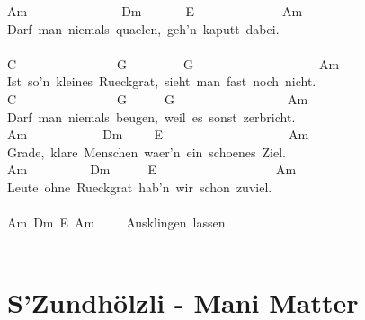 \documentclass[]{book}
\let\stdsection\section
\renewcommand\section{\clearpage\stdsection}
\begin{document}
Am~~~~~~~~~~~~~~~Dm~~~~~~~E~~~~~~~~~~~~~~Am\\
Darf~man~niemals~quaelen,~geh'n~kaputt~dabei.\\
~\\
C~~~~~~~~~~~~~~~~G~~~~~~~~~G~~~~~~~~~~~~~~~~~~~~Am~\\
Ist~so'n~kleines~Rueckgrat,~sieht~man~fast~noch~nicht.\\
C~~~~~~~~~~~~~~~~G~~~~~~G~~~~~~~~~~~~~~~~~~Am~\\
Darf~man~niemals~beugen,~weil~es~sonst~zerbricht.\\
Am~~~~~~~~~~~~Dm~~~~~E~~~~~~~~~~~~~~~~~~~~Am\\
Grade,~klare~Menschen~waer'n~ein~schoenes~Ziel.\\
Am~~~~~~~~~~Dm~~~~~~E~~~~~~~~~~~~~~~~~~~Am\\
Leute~ohne~Rueckgrat~hab'n~wir~schon~zuviel.\\
~\\
Am~Dm~E~Am~~~~~Ausklingen~lassen~~\\
~\\

\hypertarget{szundholzli---mani-matter}{%
\section{S'Zundhölzli - Mani Matter}\label{szundholzli---mani-matter}}
\end{document}
